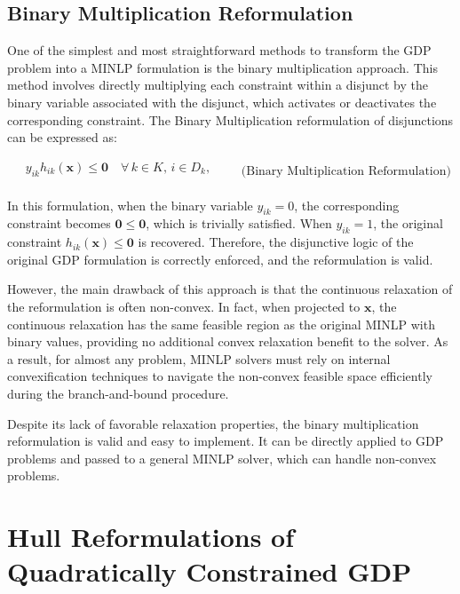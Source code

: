 \documentclass[11pt]{article}
\begin{document}
\subsection{Binary Multiplication Reformulation}

One of the simplest and most straightforward methods to transform the GDP problem into a MINLP formulation is the binary multiplication approach.
This method involves directly multiplying each constraint within a disjunct by the binary variable associated with the disjunct, which activates or deactivates the corresponding constraint.
The Binary Multiplication reformulation of disjunctions can be expressed as:

\begingroup
\begin{equation}
\begin{aligned}
    & y_{ik}h_{ik}(\mathbf{x}) \leq \mathbf{0}
        \quad \forall\, k \in K,\, i \in D_k, \\
\end{aligned}
\qquad \text{(Binary Multiplication Reformulation)}
\end{equation}
\endgroup



In this formulation, when the binary variable \(y_{ik} = 0\), the corresponding constraint becomes \(\mathbf{0}\leq\mathbf{0}\), which is trivially satisfied. When \(y_{ik} = 1\), the original constraint \(h_{ik}(\mathbf{x}) \leq \mathbf{0}\) is recovered.
Therefore, the disjunctive logic of the original GDP formulation is correctly enforced, and the reformulation is valid.


However, the main drawback of this approach is that the continuous relaxation of the reformulation is often non-convex.
In fact, when projected to $\mathbf{x}$, the continuous relaxation has the same feasible region as the original MINLP with binary values, providing no additional convex relaxation benefit to the solver.
As a result, for almost any problem, MINLP solvers must rely on internal convexification techniques to navigate the non-convex feasible space efficiently during the branch-and-bound procedure.

Despite its lack of favorable relaxation properties, the binary multiplication reformulation is valid and easy to implement.
It can be directly applied to GDP problems and passed to a general MINLP solver, which can handle non-convex problems. 



\section{Hull Reformulations of Quadratically Constrained GDP}
\label{sec:hr_q-gdp}
\end{document}
